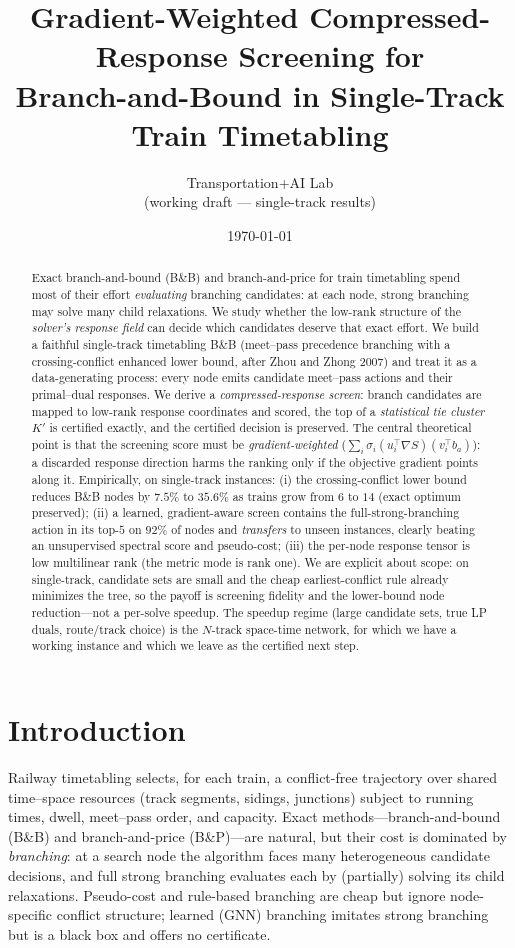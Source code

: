 \documentclass[11pt]{article}
\title{\bf Gradient-Weighted Compressed-Response Screening for\\
Branch-and-Bound in Single-Track Train Timetabling}
\author{Transportation+AI Lab \\ \small (working draft --- single-track results)}
\date{\today}
\begin{document}
\maketitle

\begin{abstract}
Exact branch-and-bound (B\&B) and branch-and-price for train timetabling spend most of
their effort \emph{evaluating} branching candidates: at each node, strong branching may
solve many child relaxations. We study whether the low-rank structure of the
\emph{solver's response field} can decide which candidates deserve that exact effort. We
build a faithful single-track timetabling B\&B (meet--pass precedence branching with a
crossing-conflict enhanced lower bound, after Zhou and Zhong 2007) and treat it as a
data-generating process: every node emits candidate meet--pass actions and their
primal--dual responses. We derive a \emph{compressed-response screen}: branch candidates are
mapped to low-rank response coordinates and scored, the top of a \emph{statistical tie
cluster} $K'$ is certified exactly, and the certified decision is preserved. The central
theoretical point is that the screening score must be \emph{gradient-weighted}
($\sum_i \sigma_i (u_i^\top\nabla S)(v_i^\top b_a)$): a discarded response direction harms
the ranking only if the objective gradient points along it. Empirically, on single-track
instances: (i) the crossing-conflict lower bound reduces B\&B nodes by $7.5\%$ to $35.6\%$
as trains grow from $6$ to $14$ (exact optimum preserved); (ii) a learned, gradient-aware
screen contains the full-strong-branching action in its top-$5$ on $92\%$ of nodes and
\emph{transfers} to unseen instances, clearly beating an unsupervised spectral score and
pseudo-cost; (iii) the per-node response tensor is low multilinear rank (the metric mode is
rank one). We are explicit about scope: on single-track, candidate sets are small and the
cheap earliest-conflict rule already minimizes the tree, so the payoff is screening fidelity
and the lower-bound node reduction---not a per-solve speedup. The speedup regime (large
candidate sets, true LP duals, route/track choice) is the $N$-track space-time network, for
which we have a working instance and which we leave as the certified next step.
\end{abstract}

\section{Introduction}
Railway timetabling selects, for each train, a conflict-free trajectory over shared
time--space resources (track segments, sidings, junctions) subject to running times, dwell,
meet--pass order, and capacity. Exact methods---branch-and-bound (B\&B) and branch-and-price
(B\&P)---are natural, but their cost is dominated by \emph{branching}: at a search node the
algorithm faces many heterogeneous candidate decisions, and full strong branching evaluates
each by (partially) solving its child relaxations. Pseudo-cost and rule-based branching are
cheap but ignore node-specific conflict structure; learned (GNN) branching imitates strong
branching but is a black box and offers no certificate.
\end{document}
